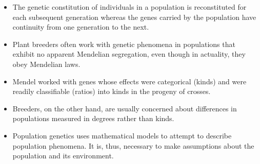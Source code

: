 \documentclass[11pt,ignorenonframetext,aspectratio=169]{beamer}
\providecommand{\tightlist}{%
  \setlength{\itemsep}{0pt}\setlength{\parskip}{0pt}}
\begin{document}
\begin{frame}{}
\protect\hypertarget{section-7}{}
\begin{itemize}
\tightlist
\item
  The genetic constitution of individuals in a population is
  reconstituted for each subsequent generation whereas the genes carried
  by the population have continuity from one generation to the next.
\item
  Plant breeders often work with genetic phenomena in populations that
  exhibit no apparent Mendelian segregation, even though in actuality,
  they obey Mendelian laws.
\item
  Mendel worked with genes whose effects were categorical (kinds) and
  were readily classifiable (ratios) into kinds in the progeny of
  crosses.
\item
  Breeders, on the other hand, are usually concerned about differences
  in populations measured in degrees rather than kinds.
\item
  Population genetics uses mathematical models to attempt to describe
  population phenomena. It is, thus, necessary to make assumptions about
  the population and its environment.
\end{itemize}
\end{frame}
\end{document}
